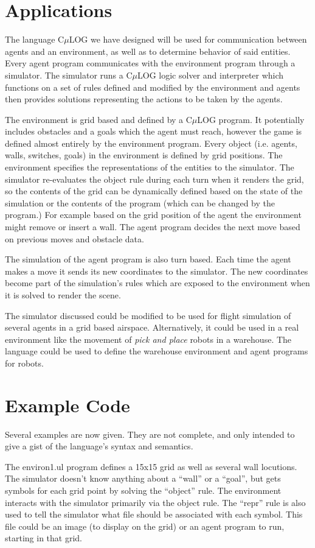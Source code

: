 \documentclass[onecolumn,titlepage]{article}
\begin{document}
\section{Applications}
The language C$\mu$LOG we have designed will be used for communication 
between agents and an environment, as well as to determine behavior of said
entities. Every agent program communicates 
with the environment program through a simulator. The simulator runs a
C$\mu$LOG logic solver and interpreter which functions on a set of rules 
defined and modified by the environment and agents then provides solutions
representing the actions to be taken by the agents.

The environment is grid based and defined by a C$\mu$LOG program.  It
potentially includes obstacles and a goals which the agent must reach, however
the game is defined almost entirely by the environment program.
Every object (i.e. agents, walls, switches, goals)
in the environment is defined by grid positions.  The environment specifies
the representations of the entities to the simulator.  The 
simulator re-evaluates the object rule during each turn when it renders
the grid, so the contents of the grid can be dynamically defined based on the state
of the simulation or the contents of the program (which can be changed by the program.)
 For example based on the grid position
of the agent the environment might remove or insert a wall. The agent program
decides the next move based on previous moves and obstacle data.

The simulation of the agent program is also turn based. Each time the agent 
makes a move it sends its new coordinates to the simulator. The new coordinates
become part of the simulation's rules which are exposed to the environment when
it is solved to render the scene.

The simulator discussed could be modified to be used for flight simulation
of several agents in a grid based airspace. Alternatively, it could be used in a real
environment like the movement of {\it pick and place} robots in a warehouse. 
The language could be used to define the warehouse environment and agent 
programs for robots.

\section{Example Code}
Several examples are now given.  They are not complete, and only intended
to give a gist of the language's syntax and semantics.

The environ1.ul program defines a 15x15 grid as well as several wall locutions.
The simulator doesn't know anything about a ``wall'' or a ``goal'', but gets
symbols for each grid point by solving the ``object'' rule.  The environment
interacts with the simulator primarily via the object rule.  The ``repr'' rule
is also used to tell the simulator what file should be associated with each
symbol.  This file could be an image (to display on the grid) or an agent program
to run, starting in that grid.
\end{document}
